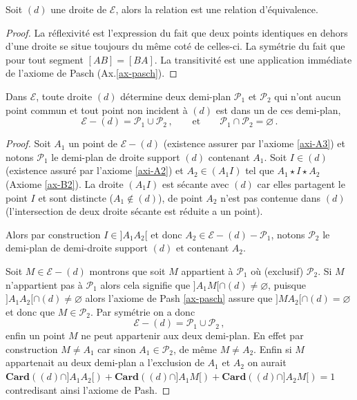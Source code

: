 \begin{prop}\label{prop-memecoterelequi}
Soit $(d)$ une droite de $\mathcal{E}$, alors la relation  est une relation d'équivalence.
\end{prop}

\begin{proof}
La réflexivité est l'expression du fait que deux points identiques en dehors d'une droite se situe toujours du même coté de celles-ci. La symétrie du fait que pour tout segment $[AB]=[BA]$. La transitivité est une application immédiate de l'axiome de Pasch (Ax.\ref{ax-pasch}). 
\end{proof}

\begin{thm}\label{thm-partitiondemiplan}
Dans $\mathcal{E}$, toute droite $(d)$ détermine deux demi-plan $\mathcal{P}_1$ et $\mathcal{P}_2$ qui n'ont aucun point commun et tout point non incident à $(d)$ est dans un de ces demi-plan,
\begin{equation*}
    \mathcal{E} - (d) = \mathcal{P}_1 \cup \mathcal{P}_2\,, \qquad \text{et} \qquad \mathcal{P}_1 \cap \mathcal{P}_2 = \varnothing\,.
\end{equation*}
\begin{proof}
Soit $A_1$ un point de $\mathcal{E} - (d)$ (existence assurer par l'axiome \ref{axi-A3}) et notons $\mathcal{P}_1$ le demi-plan de droite support $(d)$ contenant $A_1$. Soit $I\in (d)$ (existence assuré par l'axiome \ref{axi-A2}) et $A_2\in(A_1 I)$ tel que $A_1 \star I \star A_2$ (Axiome \ref{ax-B2}). La droite $(A_1 I)$ est sécante avec $(d)$ car elles partagent le point $I$ et sont distincte ($A_1\notin (d)$), de point $A_2$ n'est pas contenue dans $(d)$ (l'intersection de deux droite sécante est réduite a un point).

Alors par construction $I\in ]A_1 A_2[$ et donc $A_2 \in \mathcal{E}-(d)-\mathcal{P}_1$, notons $\mathcal{P}_2$ le demi-plan de demi-droite support $(d)$ et contenant $A_2$. 

Soit $M\in\mathcal{E}-(d)$ montrons que soit $M$ appartient à $\mathcal{P}_1$ où (exclusif) $\mathcal{P}_2$. Si $M$ n'appartient pas à $\mathcal{P}_1$ alors cela signifie que $]A_1 M[\cap (d) \neq \varnothing$, puisque $]A_1 A_2[\cap (d) \neq \varnothing$ alors l'axiome de Pash \ref{ax-pasch} assure que $]M A_2[\cap (d) = \varnothing$ et donc que $M \in \mathcal{P}_2$. Par symétrie on a donc $$\mathcal{E} - (d) = \mathcal{P}_1 \cup \mathcal{P}_2\,,$$ enfin un point $M$ ne peut appartenir aux deux demi-plan. En effet par construction $M\neq A_1$ car sinon $A_1 \in \mathcal{P}_2$, de même $M\neq A_2$. Enfin si $M$ appartenait au deux demi-plan a l'exclusion de $A_1$ et $A_2$ on aurait $\mathbf{Card}\left((d)\cap]A_1 A_2[\right)+\mathbf{Card}\left((d)\cap]A_1 M[\right)+\mathbf{Card}\left((d)\cap]A_2 M[\right)=1$ contredisant ainsi l'axiome de Pash. 
\end{proof}
\end{thm}


